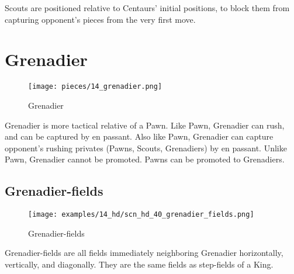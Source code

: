 Scouts are positioned relative to Centaurs' initial positions, to block them
from capturing opponent's pieces from the very first move.

\clearpage %

\section*{Grenadier}
\label{sec:Hemera's Dawn/Grenadier}

\vspace*{-0.7\baselineskip}
\noindent
\begin{wrapfigure}[10]{l}{0.4\textwidth}
\centering
\texttt{[image: pieces/14\_grenadier.png]}
\vspace*{-1.3\baselineskip}
\caption{Grenadier}
\label{fig:14_grenadier}
\end{wrapfigure}
Grenadier is more tactical relative of a Pawn. Like Pawn, Grenadier can rush, and
can be captured by en passant. Also like Pawn, Grenadier can capture opponent's
rushing privates (Pawns, Scouts, Grenadiers) by en passant. Unlike Pawn, Grenadier
cannot be promoted. Pawns can be promoted to Grenadiers.

\vspace*{-0.3\baselineskip}
\subsection*{Grenadier-fields}
\label{sec:Hemera's Dawn/Grenadier/Grenadier-fields}

\vspace*{-0.7\baselineskip}
\noindent
\begin{wrapfigure}[5]{l}{0.4\textwidth}
\centering
\texttt{[image: examples/14\_hd/scn\_hd\_40\_grenadier\_fields.png]}
\vspace*{-0.5\baselineskip}
\caption{Grenadier-fields}
\label{fig:scn_hd_40_grenadier_fields}
\end{wrapfigure}
Grenadier-fields are all fields immediately neighboring Grenadier horizontally,
vertically, and diagonally. They are the same fields as step-fields of a King.

\vspace*{2.3\baselineskip}
